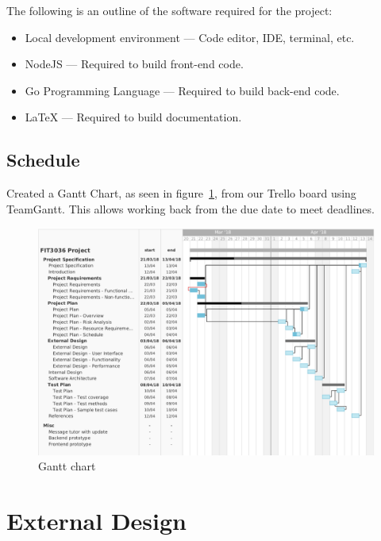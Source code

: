 \documentclass[a4paper,11pt]{article}
\begin{document}
The following is an outline of the software required for the project:

\begin{itemize}
  \item Local development environment --- Code editor, IDE, terminal, etc.
  \item NodeJS --- Required to build front-end code.
  \item Go Programming Language --- Required to build back-end code.
  \item \LaTeX{} --- Required to build documentation.
\end{itemize}

\subsection{Schedule}

Created a Gantt Chart, as seen in figure~\ref{fig:gantt}, from our Trello board
using TeamGantt. This allows working back from the due date to meet deadlines.

\begin{figure}[H]
  \includegraphics[width=\textwidth]{gantt-chart}
  \caption{Gantt chart}\label{fig:gantt}
\end{figure}

\section{External Design}


\end{document}
